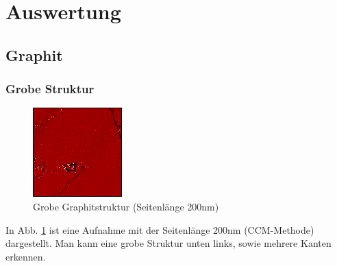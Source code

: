 \section{Auswertung}
\subsection{Graphit}
\subsubsection{Grobe Struktur}
\begin{figure}
\centering
\includegraphics[scale=1]{data/graphit/raw_big.png}
\caption{Grobe Graphitstruktur (Seitenlänge 200nm)}
\label{fig:raw_big}
\end{figure}
In Abb. \ref{fig:raw_big} ist eine Aufnahme mit der Seitenlänge 200nm (CCM-Methode) dargestellt. Man kann eine grobe Struktur unten links, sowie mehrere Kanten erkennen.

